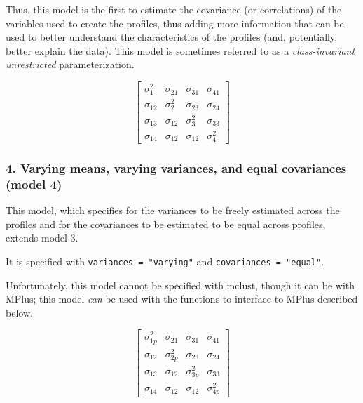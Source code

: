\documentclass[man]{apa6}
\begin{document}
Thus, this model is the first to estimate the covariance (or correlations) of the variables used to create the profiles, thus adding more information that can be used to better understand the characteristics of the profiles (and, potentially, better explain the data). This model is sometimes referred to as a \emph{class-invariant unrestricted} parameterization.

\[
\left[ \begin{matrix} { \sigma  }_{ 1 }^{ 2 } & { \sigma  }_{ 21 } & { \sigma  }_{ 31 } & { \sigma  }_{ 41 } \\ { \sigma  }_{ 12 } & { \sigma  }_{ 2 }^{ 2 } & { \sigma  }_{ 23 } & { \sigma  }_{ 24 } \\ { \sigma  }_{ 13 } & { \sigma  }_{ 12 } & { \sigma  }_{ 3 }^{ 2 } & { \sigma  }_{ 33 } \\ { \sigma  }_{ 14 } & { \sigma  }_{ 12 } & { \sigma  }_{ 12 } & { \sigma  }_{ 4 }^{ 2 } \end{matrix} \right] 
\]

\hypertarget{varying-means-varying-variances-and-equal-covariances-model-4}{%
\subsubsection{4. Varying means, varying variances, and equal covariances (model 4)}\label{varying-means-varying-variances-and-equal-covariances-model-4}}

This model, which specifies for the variances to be freely estimated across the profiles and for the covariances to be estimated to be equal across profiles, extends model 3.

It is specified with \texttt{variances\ =\ "varying"} and \texttt{covariances\ =\ "equal"}.

Unfortunately, this model cannot be specified with mclust, though it can be with MPlus; this model \emph{can} be used with the functions to interface to MPlus described below.

\[
\left[ \begin{matrix} { \sigma  }_{ 1p }^{ 2 } & { \sigma  }_{ 21 } & { \sigma  }_{ 31 } & { \sigma  }_{ 41 } \\ { \sigma  }_{ 12 } & { \sigma  }_{ 2p }^{ 2 } & { \sigma  }_{ 23 } & { \sigma  }_{ 24 } \\ { \sigma  }_{ 13 } & { \sigma  }_{ 12 } & { \sigma  }_{ 3p }^{ 2 } & { \sigma  }_{ 33 } \\ { \sigma  }_{ 14 } & { \sigma  }_{ 12 } & { \sigma  }_{ 12 } & { \sigma  }_{ 4p }^{ 2 } \end{matrix} \right] 
\]
\end{document}
